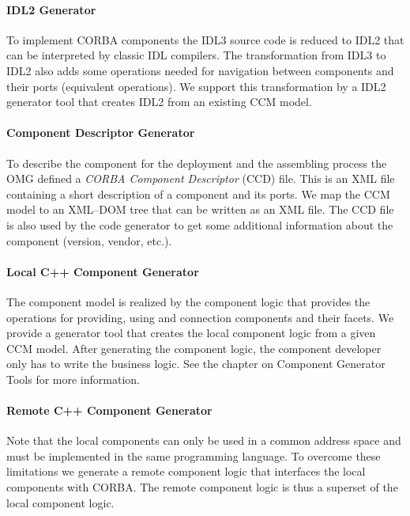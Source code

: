 \paragraph{IDL2 Generator}

To implement CORBA components the IDL3 source code is reduced to IDL2 that can
be interpreted by classic IDL compilers. The transformation from IDL3 to IDL2
also adds some operations needed for navigation between components and their
ports (equivalent operations). We support this transformation by a IDL2
generator tool that creates IDL2 from an existing CCM model.

\paragraph{Component Descriptor Generator}

To describe the component for the deployment and the assembling process the OMG
defined a {\it CORBA Component Descriptor} (CCD) file. This is an XML file
containing a short description of a component and its ports. We map the CCM
model to an XML--DOM tree that can be written as an XML file. The CCD file is
also used by the code generator to get some additional information about the
component (version, vendor, etc.).

\paragraph{Local C++ Component Generator}

The component model is realized by the component logic that provides the
operations for providing, using and connection components and their facets. We
provide a generator tool that creates the local component logic from a given
CCM model. After generating the component logic, the component developer only
has to write the business logic. See the chapter on Component Generator Tools
for more information.

\paragraph{Remote C++ Component Generator}

Note that the local components can only be used in a common address space and
must be implemented in the same programming language. To overcome these
limitations we generate a remote component logic that interfaces the local
components with CORBA. The remote component logic is thus a superset of the
local component logic.

